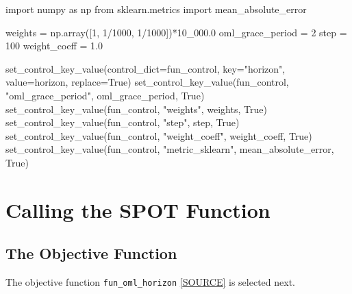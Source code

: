 \documentclass[
  letterpaper,
  DIV=11,
  numbers=noendperiod]{scrreprt}
\newenvironment{Shaded}{\begin{snugshade}}{\end{snugshade}}
\newcommand{\DecValTok}[1]{\textcolor[rgb]{0.68,0.00,0.00}{#1}}
\newcommand{\FloatTok}[1]{\textcolor[rgb]{0.68,0.00,0.00}{#1}}
\newcommand{\ImportTok}[1]{\textcolor[rgb]{0.00,0.46,0.62}{#1}}
\newcommand{\NormalTok}[1]{\textcolor[rgb]{0.00,0.23,0.31}{#1}}
\newcommand{\OperatorTok}[1]{\textcolor[rgb]{0.37,0.37,0.37}{#1}}
\newcommand{\StringTok}[1]{\textcolor[rgb]{0.13,0.47,0.30}{#1}}
\newcommand{\VariableTok}[1]{\textcolor[rgb]{0.07,0.07,0.07}{#1}}
\begin{document}
\begin{Shaded}
\begin{Highlighting}[]
\ImportTok{import}\NormalTok{ numpy }\ImportTok{as}\NormalTok{ np}
\ImportTok{from}\NormalTok{ sklearn.metrics }\ImportTok{import}\NormalTok{ mean\_absolute\_error}

\NormalTok{weights }\OperatorTok{=}\NormalTok{ np.array([}\DecValTok{1}\NormalTok{, }\DecValTok{1}\OperatorTok{/}\DecValTok{1000}\NormalTok{, }\DecValTok{1}\OperatorTok{/}\DecValTok{1000}\NormalTok{])}\OperatorTok{*}\FloatTok{10\_000.0}
\NormalTok{oml\_grace\_period }\OperatorTok{=} \DecValTok{2}
\NormalTok{step }\OperatorTok{=} \DecValTok{100}
\NormalTok{weight\_coeff }\OperatorTok{=} \FloatTok{1.0}

\NormalTok{set\_control\_key\_value(control\_dict}\OperatorTok{=}\NormalTok{fun\_control,}
\NormalTok{                        key}\OperatorTok{=}\StringTok{"horizon"}\NormalTok{,}
\NormalTok{                        value}\OperatorTok{=}\NormalTok{horizon,}
\NormalTok{                        replace}\OperatorTok{=}\VariableTok{True}\NormalTok{)}
\NormalTok{set\_control\_key\_value(fun\_control, }\StringTok{"oml\_grace\_period"}\NormalTok{, oml\_grace\_period, }\VariableTok{True}\NormalTok{)}
\NormalTok{set\_control\_key\_value(fun\_control, }\StringTok{"weights"}\NormalTok{, weights, }\VariableTok{True}\NormalTok{)}
\NormalTok{set\_control\_key\_value(fun\_control, }\StringTok{"step"}\NormalTok{, step, }\VariableTok{True}\NormalTok{)}
\NormalTok{set\_control\_key\_value(fun\_control, }\StringTok{"weight\_coeff"}\NormalTok{, weight\_coeff, }\VariableTok{True}\NormalTok{)}
\NormalTok{set\_control\_key\_value(fun\_control, }\StringTok{"metric\_sklearn"}\NormalTok{, mean\_absolute\_error, }\VariableTok{True}\NormalTok{)}
\end{Highlighting}
\end{Shaded}

\section{Calling the SPOT Function}\label{calling-the-spot-function}

\subsection{The Objective Function}\label{sec-the-objective-function-13}

The objective function \texttt{fun\_oml\_horizon}
\href{https://github.com/sequential-parameter-optimization/spotRiver/blob/main/src/spotRiver/fun/hyperriver.py}{{[}SOURCE{]}}
is selected next.
\end{document}
